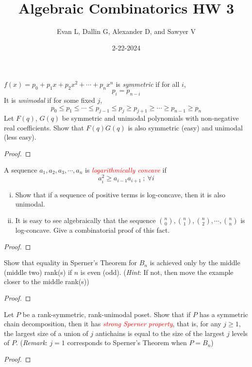 \documentclass[11pt]{scrartcl}
\title{Algebraic Combinatorics HW 3}
\author{Evan L, Dallin G, Alexander D, and Sawyer V}
\date{2-22-2024}
\begin{document}
\maketitle
\setcounter{section}{1}
\begin{problem}[\textcolor{red}{Symmetric polynomial and unimodality}]
    $f(x)= p_0 + p_1x + p_2x^2 + \cdots + p_nx^n$ is \textit{symmetric} if for all $i$, $$p_i=p_{n-i}$$ It is \textit{unimodal} if for some fixed $j$, $$p_0\le p_1\le \cdots \le p_{j-1}\le p_j \ge p_{j+1}\ge \cdots \ge p_{n-1}\ge p_n$$ Let $F(q)$, $G(q)$ be symmetric and unimodal polynomials with non-negative real coefficients. Show that $F(q)G(q)$ is also symmetric (easy) and unimodal (less easy).
\end{problem}
\begin{proof}
\end{proof}

\begin{problem}[\textcolor{red}{Log-concavity of Binomial coefficients}]
    A sequence $a_1,a_2, a_3, \cdots, a_n$ is \textcolor{red}{\textit{logarithmically concave}} if $$a_i^2\ge a_{i-1}a_{i+1}~;~ \forall i$$

    \begin{enumerate}[(i)]
        \item Show that if a sequence of positive terms is log-concave, then it is also unimodal.\smallskip
        \item It is easy to see algebraically that the sequence $\binom{n}{0},\binom{n}{1}, \binom{n}{2}, \cdots, \binom{n}{n}$ is log-concave. Give a combinatorial proof of this fact.
    \end{enumerate}
\end{problem}

\begin{proof}
    
\end{proof}

\begin{problem}[\textcolor{red}{Uniqueness in Sperner's Thm}]
    Show that equality in Sperner's Theorem for $B_n$ is achieved only by the middle (middle two) rank(s) if $n$ is even (odd). (\textit{Hint}: If not, then move the example closer to the middle rank(s))
\end{problem}
\begin{proof}
\end{proof}

\begin{problem}[\textcolor{red}{A generalization of Sperner's Thm}]
    Let $P$ be a rank-symmetric, rank-unimodal poset. Show that if $P$ has a symmetric chain decomposition, then it has \textcolor{red}{\textit{strong Sperner property}}, that is, for any $j\ge 1$, the largest size of a union of $j$ antichains is equal to the size of the largest $j$ levels of $P$. (\textit{Remark}: $j=1$ corresponds to Sperner's Theorem when $P=B_n$)
\end{problem}

\begin{proof}
\end{proof}
\end{document}
